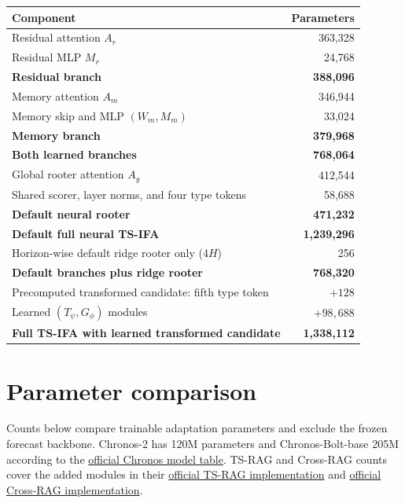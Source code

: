 \documentclass[10pt]{article}
\begin{document}
\begin{center}
\begin{tabular}{lr}
\toprule
Component & Parameters\\
\midrule
Residual attention $A_r$ & 363,328\\
Residual MLP $M_r$ & 24,768\\
\textbf{Residual branch} & \textbf{388,096}\\
Memory attention $A_m$ & 346,944\\
Memory skip and MLP $(W_m,M_m)$ & 33,024\\
\textbf{Memory branch} & \textbf{379,968}\\
\midrule
\textbf{Both learned branches} & \textbf{768,064}\\
Global rooter attention $A_g$ & 412,544\\
Shared scorer, layer norms, and four type tokens & 58,688\\
\textbf{Default neural rooter} & \textbf{471,232}\\
\midrule
\textbf{Default full neural TS-IFA} & \textbf{1,239,296}\\
Horizon-wise default ridge rooter only ($4H$) & 256\\
\textbf{Default branches plus ridge rooter} & \textbf{768,320}\\
\midrule
Precomputed transformed candidate: fifth type token & $+128$\\
Learned $(T_\psi,G_\phi)$ modules & $+98,688$\\
\textbf{Full TS-IFA with learned transformed candidate} & \textbf{1,338,112}\\
\bottomrule
\end{tabular}
\end{center}

\section{Parameter comparison}
Counts below compare trainable adaptation parameters and exclude the frozen
forecast backbone.  Chronos-2 has 120M parameters and Chronos-Bolt-base 205M
according to the
\href{https://github.com/amazon-science/chronos-forecasting}{official Chronos
model table}.  TS-RAG and Cross-RAG counts cover the added modules in their
\href{https://github.com/UConn-DSIS/TS-RAG/blob/main/TS-RAG/models/ChronosBolt.py}{official
TS-RAG implementation} and
\href{https://github.com/seunghan96/cross-rag/blob/main/cross-rag/models/CrossRAG.py}{official
Cross-RAG implementation}.
\end{document}
